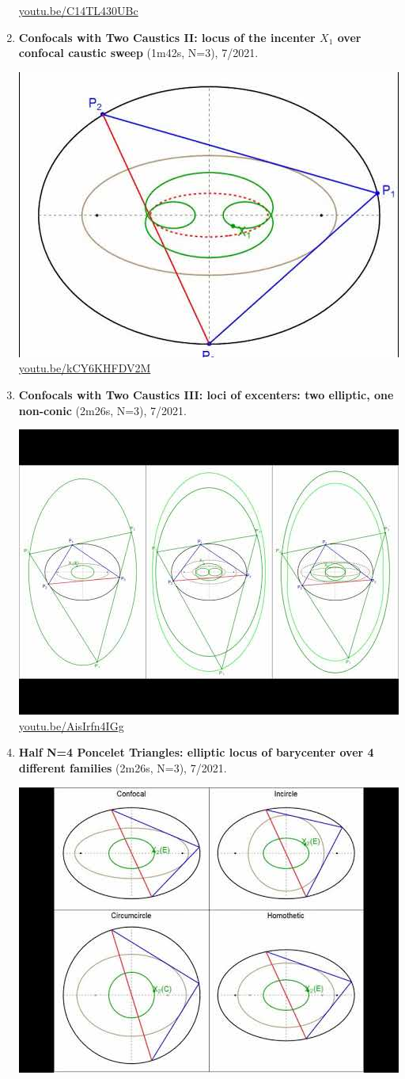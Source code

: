 \documentclass[12pt]{amsart}
\begin{document}
\begin{enumerate}[resume]
\begin{center}
\href{https://youtu.be/C14TL430UBc}{\url{youtu.be/C14TL430UBc}}\end{center}
% 
\item \textbf{Confocals with Two Caustics II: locus of the incenter $X_{1}$ over confocal caustic sweep} (1m42s, N=3), 7/2021. 
\begin{center}\includegraphics[width=.5\textwidth]{pics/kCY6KHFDV2M.jpg} \\ 
\href{https://youtu.be/kCY6KHFDV2M}{\url{youtu.be/kCY6KHFDV2M}}\end{center}
% 
\item \textbf{Confocals with Two Caustics III: loci of excenters: two elliptic, one non-conic} (2m26s, N=3), 7/2021. 
\begin{center}\includegraphics[width=.5\textwidth]{pics/AisIrfn4IGg.jpg} \\ 
\href{https://youtu.be/AisIrfn4IGg}{\url{youtu.be/AisIrfn4IGg}}\end{center}
% 
\item \textbf{Half N=4 Poncelet Triangles: elliptic locus of barycenter over 4 different families} (2m26s, N=3), 7/2021. 
\begin{center}\includegraphics[width=.5\textwidth]{pics/6yNod1LFVrY.jpg} \\ 

\end{center}
\end{enumerate}
\end{document}
